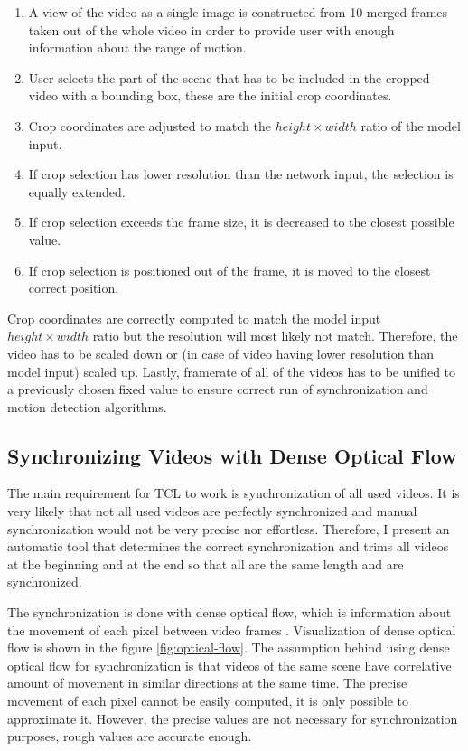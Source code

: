 \begin{enumerate}
    \item A view of the video as a single image is constructed from 10 merged frames taken out of the whole video in order to provide user with enough information about the range of motion.
    \item User selects the part of the scene that has to be included in the cropped video with a bounding box, these are the initial crop coordinates.
    \item Crop coordinates are adjusted to match the $height \times width$ ratio of the model input.
    \item If crop selection has lower resolution than the network input, the selection is equally extended.
    \item If crop selection exceeds the frame size, it is decreased to the closest possible value.
    \item If crop selection is positioned out of the frame, it is moved to the closest correct position.
\end{enumerate}

Crop coordinates are correctly computed to match the model input $height \times width$ ratio but the resolution will most likely not match. Therefore, the video has to be scaled down or (in case of video having lower resolution than model input) scaled up. Lastly, framerate of all of the videos has to be unified to a previously chosen fixed value to ensure correct run of synchronization and motion detection algorithms.

\subsection{\label{sec:dataset-sync}Synchronizing Videos with Dense Optical Flow}

The main requirement for TCL to work is synchronization of all used videos. It is very likely that not all used videos are perfectly synchronized and manual synchronization would not be very precise nor effortless. Therefore, I present an automatic tool that determines the correct synchronization and trims all videos at the beginning and at the end so that all are the same length and are synchronized.

The synchronization is done with dense optical flow, which is information about the movement of each pixel between video frames \cite{HORN1981185}. Visualization of dense optical flow is shown in the figure \ref{fig:optical-flow}. The assumption behind using dense optical flow for synchronization is that videos of the same scene have correlative amount of movement in similar directions at the same time. The precise movement of each pixel cannot be easily computed, it is only possible to approximate it. However, the precise values are not necessary for synchronization purposes, rough values are accurate enough.

